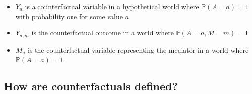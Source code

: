 \documentclass[
  12pt,
]{book}
\providecommand{\tightlist}{%
  \setlength{\itemsep}{0pt}\setlength{\parskip}{0pt}}
\theoremstyle{definition}
\theoremstyle{definition}
\theoremstyle{definition}
\renewcommand{\P}{\mathbb{P}}
\newcommand{\1}{\mathbbm{1}}
\begin{document}
\begin{itemize}
\tightlist
\item
  \(Y_a\) is a counterfactual variable in a hypothetical world where \(\P(A=a)=1\)
  with probability one for some value \(a\)
\item
  \(Y_{a,m}\) is the counterfactual outcome in a world where \(\P(A=a,M=m)=1\)
\item
  \(M_a\) is the counterfactual variable representing the mediator in a world
  where \(\P(A=a)=1\).
\end{itemize}

\hypertarget{how-are-counterfactuals-defined}{%
\subsection{How are counterfactuals defined?}\label{how-are-counterfactuals-defined}}
\end{document}
